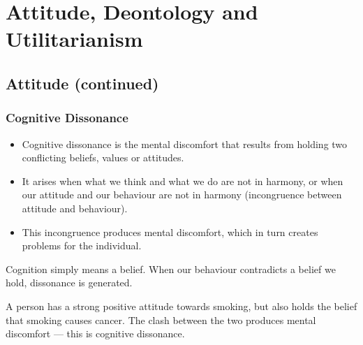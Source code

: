 
\chapter{Attitude, Deontology and Utilitarianism}

\vspace{14pt}

\section{Attitude (continued)}

\subsection{Cognitive Dissonance}

\begin{KeyConcept}
\begin{itemize}
\item Cognitive dissonance is the mental discomfort that results from holding two conflicting beliefs, values or attitudes.
\item It arises when what we think and what we do are not in harmony, or when our attitude and our behaviour are not in harmony (incongruence between attitude and behaviour).
\item This incongruence produces mental discomfort, which in turn creates problems for the individual.
\end{itemize}
\end{KeyConcept}

Cognition simply means a belief. When our behaviour contradicts a belief we hold, dissonance is generated.

\begin{ExampleBox}
A person has a strong positive attitude towards smoking, but also holds the belief that smoking causes cancer. The clash between the two produces mental discomfort --- this is cognitive dissonance.
\end{ExampleBox}

